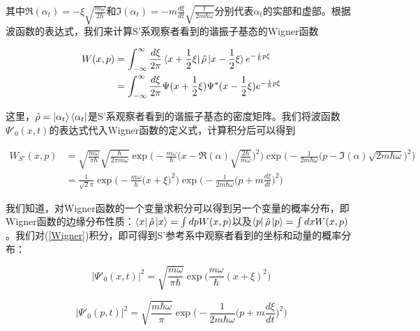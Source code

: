\documentclass[a4paper]{article}
\begin{document}
        其中$\Re(\alpha_t)=-\xi\sqrt{\frac{m\omega}{2\hbar}}$和$\Im(\alpha_t)=-m\frac{d\xi}{dt}\sqrt{\frac{1}{2m\hbar\omega}}$分别代表$\alpha_t$的实部和虚部。根据波函数的表达式，我们来计算S'系观察者看到的谐振子基态的Wigner函数

        \begin{equation}
            \begin{split}
                W(x, p) &= \int_{-\infty}^\infty \frac{d\xi}{2\pi}\bra{x+\frac{1}{2}\xi}\hat{\rho}\ket{x-\frac{1}{2}\xi} e^{-\frac{i}{\hbar}p\xi} \\
                    &= \int_{-\infty}^\infty\frac{d\xi}{2\pi} \Psi(x+\frac{1}{2}\xi)\Psi^*(x-\frac{1}{2}\xi) e^{-\frac{i}{\hbar}p\xi}
            \end{split}
        \end{equation}

        这里，$\hat{\rho}=\ket{\alpha_t}\bra{\alpha_t}$是S'系观察者看到的谐振子基态的密度矩阵。我们将波函数$\Psi'_0(x,t)$的表达式代入Wigner函数的定义式，计算积分后可以得到

        \begin{equation}\label{Wigner}
            \begin{split}
                W_{S'}(x, p) &= \sqrt{\frac{m\omega}{\pi\hbar}} \sqrt{\frac{\hbar}{2\pi m\omega}} \exp\biggl(-\frac{m\omega}{\hbar}\bigl(x-\Re(\alpha)\sqrt{\frac{2\hbar}{m\omega}}\bigr)^2\biggr) \exp\biggl(-\frac{1}{2m\hbar\omega}\bigl(p-\Im(\alpha)\sqrt{2m\hbar\omega}\bigr)^2\biggr) \\
                    &= \frac{1}{\sqrt{2}\pi} \exp\biggl(-\frac{m\omega}{\hbar}\bigl(x+\xi\bigr)^2\biggr) \exp\biggl(-\frac{1}{2m\hbar\omega}\bigl(p+m\frac{d\xi}{dt}\bigr)^2\biggr)
            \end{split}
        \end{equation}

        我们知道，对Wigner函数的一个变量求积分可以得到另一个变量的概率分布，即Wigner函数的边缘分布性质：$\bra{x}\hat{\rho}\ket{x}=\int dp W(x, p)$以及$\bra{p}\hat{\rho}\ket{p}=\int dx W(x, p)$。我们对(\ref{Wigner})积分，即可得到S'参考系中观察者看到的坐标和动量的概率分布：

        \begin{equation}
            |\Psi'_0(x,t)|^2 = \sqrt{\frac{m\omega}{\pi\hbar}} \exp\bigg(\frac{m\omega}{\hbar}(x+\xi)^2\bigg)
        \end{equation}

        \begin{equation}
            |\Psi'_0(p,t)|^2 = \sqrt{\frac{m\hbar\omega}{\pi}} \exp\biggl(-\frac{1}{2m\hbar\omega}\bigl(p+m\frac{d\xi}{dt}\bigr)^2\biggr)
        \end{equation}
        
\end{document}
